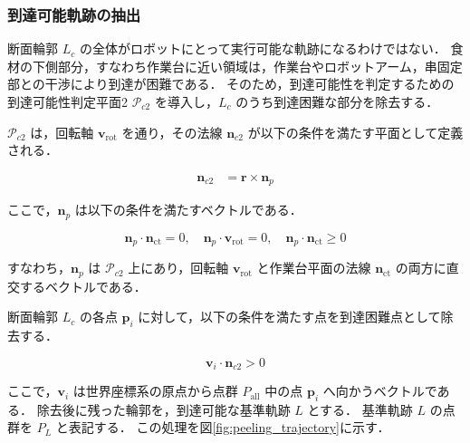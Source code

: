 \subsubsection{到達可能軌跡の抽出}

断面輪郭 $L_c$ の全体がロボットにとって実行可能な軌跡になるわけではない．
食材の下側部分，すなわち作業台に近い領域は，作業台やロボットアーム，串固定部との干渉により到達が困難である．
そのため，到達可能性を判定するための到達可能性判定平面2 $\mathcal{P}_{c2}$ を導入し，$L_c$ のうち到達困難な部分を除去する．

$\mathcal{P}_{c2}$ は，回転軸 $\mathbf{v}_{\mathrm{rot}}$ を通り，その法線 $\mathbf{n}_{c2}$ が以下の条件を満たす平面として定義される．

\begin{align}
  \mathbf{n}_{c2} &= \mathbf{r} \times \mathbf{n}_p \label{eq:peeling_cut_plane_2}
\end{align}

ここで，$\mathbf{n}_p$ は以下の条件を満たすベクトルである．

\begin{equation}
  \mathbf{n}_p \cdot \mathbf{n}_{\mathrm{ct}} = 0,\quad
  \mathbf{n}_p \cdot \mathbf{v}_{\mathrm{rot}} = 0,\quad
  \mathbf{n}_p \cdot \mathbf{n}_{\mathrm{ct}} \ge 0
\end{equation}

すなわち，$\mathbf{n}_p$ は $\mathcal{P}_{c2}$ 上にあり，回転軸 $\mathbf{v}_{\mathrm{rot}}$ と作業台平面の法線 $\mathbf{n}_{\mathrm{ct}}$ の両方に直交するベクトルである．

断面輪郭 $L_c$ の各点 $\mathbf{p}_i$ に対して，以下の条件を満たす点を到達困難点として除去する．

\begin{equation}
  \mathbf{v}_i \cdot \mathbf{n}_{c2} > 0
  \label{eq:peeling_point_removal}
\end{equation}

ここで，$\mathbf{v}_i$ は世界座標系の原点から点群 $P_{\mathrm{all}}$ 中の点 $\mathbf{p}_i$ へ向かうベクトルである．
除去後に残った輪郭を，到達可能な基準軌跡 $L$ とする．
基準軌跡 $L$ の点群を $P_L$ と表記する．
この処理を図\ref{fig:peeling_trajectory}に示す．

